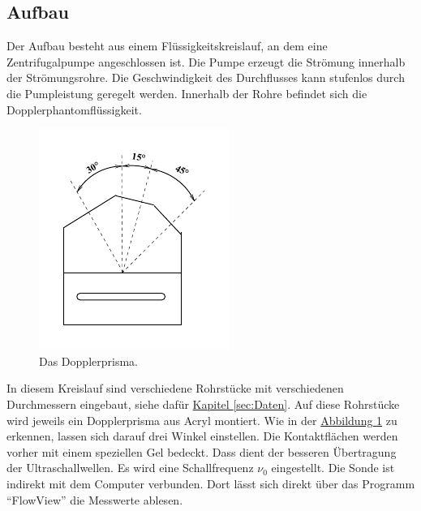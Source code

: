 \subsection{Aufbau}
Der Aufbau besteht aus einem Flüssigkeitskreislauf, an dem eine Zentrifugalpumpe angeschlossen ist.
Die Pumpe erzeugt die Strömung innerhalb der Strömungsrohre. Die Geschwindigkeit des Durchflusses kann stufenlos
durch die Pumpleistung geregelt werden. Innerhalb der Rohre befindet sich die Dopplerphantomflüssigkeit.
\begin{figure}
    \center
    \includegraphics[width=\linewidth]{pictures/Skizze2.pdf}
    \caption{Das Dopplerprisma. \cite{us3}}
    \label{fig:Skizze2}
\end{figure}
In diesem Kreislauf sind verschiedene Rohrstücke mit verschiedenen Durchmessern eingebaut, siehe dafür \hyperref[sec:Daten]{Kapitel \ref{sec:Daten}}.
Auf diese Rohrstücke wird jeweils ein Dopplerprisma aus Acryl montiert.
Wie in der \hyperref[fig:Skizze2]{Abbildung \ref{fig:Skizze2}} zu erkennen, lassen sich darauf drei Winkel einstellen.
Die Kontaktflächen werden vorher mit einem speziellen Gel bedeckt.
Dass dient der besseren Übertragung der Ultraschallwellen.
Es wird eine Schallfrequenz $\nu_0$ eingestellt.
Die Sonde ist indirekt mit dem Computer verbunden. Dort lässt sich direkt über das Programm \enquote{FlowView} die Messwerte ablesen.
